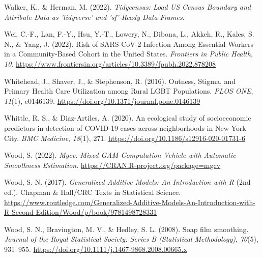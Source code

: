 \documentclass[
]{article}
\newlength{\cslhangindent}
\newlength{\cslentryspacingunit} %
\newenvironment{CSLReferences}[2] %
 {%
  \setlength{\parindent}{0pt}
  \ifodd #1
  \let\oldpar\par
  \def\par{\hangindent=\cslhangindent\oldpar}
  \fi
  \setlength{\parskip}{#2\cslentryspacingunit}
 }%
 {}
\begin{document}
\begin{CSLReferences}{1}{0}
\leavevmode{}%
Walker, K., \& Herman, M. (2022). \emph{Tidycensus: {Load} {US} {Census} {Boundary} and {Attribute} {Data} as 'tidyverse' and 'sf'-{Ready} {Data} {Frames}}.

\leavevmode{}%
Wei, C.-F., Lan, F.-Y., Hsu, Y.-T., Lowery, N., Dibona, L., Akkeh, R., Kales, S. N., \& Yang, J. (2022). Risk of {SARS}-{CoV}-2 {Infection} {Among} {Essential} {Workers} in a {Community}-{Based} {Cohort} in the {United} {States}. \emph{Frontiers in Public Health}, \emph{10}. \url{https://www.frontiersin.org/articles/10.3389/fpubh.2022.878208}

\leavevmode{}%
Whitehead, J., Shaver, J., \& Stephenson, R. (2016). Outness, {Stigma}, and {Primary} {Health} {Care} {Utilization} among {Rural} {LGBT} {Populations}. \emph{PLOS ONE}, \emph{11}(1), e0146139. \url{https://doi.org/10.1371/journal.pone.0146139}

\leavevmode{}%
Whittle, R. S., \& Diaz-Artiles, A. (2020). An ecological study of socioeconomic predictors in detection of {COVID}-19 cases across neighborhoods in {New} {York} {City}. \emph{BMC Medicine}, \emph{18}(1), 271. \url{https://doi.org/10.1186/s12916-020-01731-6}

\leavevmode{}%
Wood, S. (2022). \emph{Mgcv: {Mixed} {GAM} {Computation} {Vehicle} with {Automatic} {Smoothness} {Estimation}}. \url{https://CRAN.R-project.org/package=mgcv}

\leavevmode{}%
Wood, S. N. (2017). \emph{Generalized {Additive} {Models}: {An} {Introduction} with {R}} (2nd ed.). Chapman \& Hall/CRC Texts in Statistical Science. \url{https://www.routledge.com/Generalized-Additive-Models-An-Introduction-with-R-Second-Edition/Wood/p/book/9781498728331}

\leavevmode{}%
Wood, S. N., Bravington, M. V., \& Hedley, S. L. (2008). Soap film smoothing. \emph{Journal of the Royal Statistical Society: Series B (Statistical Methodology)}, \emph{70}(5), 931--955. \url{https://doi.org/10.1111/j.1467-9868.2008.00665.x}

\end{CSLReferences}
\end{document}
